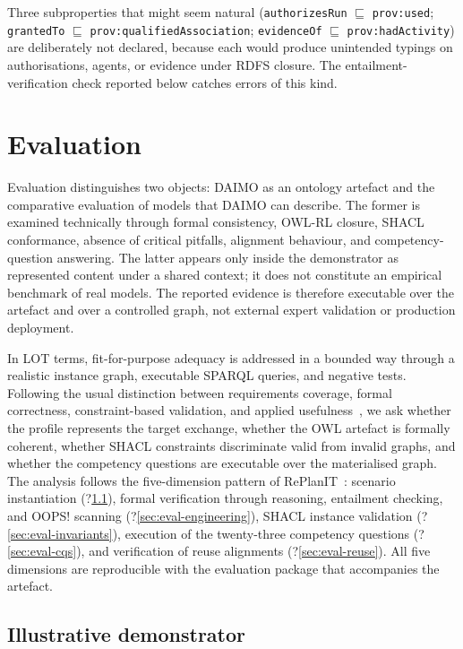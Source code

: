 \documentclass[Afour,sagev,times]{sagej}
\newcommand{\code}[1]{\texttt{#1}}
\begin{document}
Three subproperties that might seem natural (\code{authorizesRun} $\sqsubseteq$ \code{prov:used}; \code{grantedTo} $\sqsubseteq$ \code{prov:qualifiedAssociation}; \code{evidenceOf} $\sqsubseteq$ \code{prov:hadActivity}) are deliberately not declared, because each would produce unintended typings on authorisations, agents, or evidence under RDFS closure. The entailment-verification check reported below catches errors of this kind.

\section{Evaluation}\label{sec:eval}

Evaluation distinguishes two objects: DAIMO as an ontology artefact and the comparative evaluation of models that DAIMO can describe. The former is examined technically through formal consistency, OWL-RL closure, SHACL conformance, absence of critical pitfalls, alignment behaviour, and competency-question answering. The latter appears only inside the demonstrator as represented content under a shared context; it does not constitute an empirical benchmark of real models. The reported evidence is therefore executable over the artefact and over a controlled graph, not external expert validation or production deployment.

In LOT terms, fit-for-purpose adequacy is addressed in a bounded way through a realistic instance graph, executable SPARQL queries, and negative tests. Following the usual distinction between requirements coverage, formal correctness, constraint-based validation, and applied usefulness~\cite{brank05}, we ask whether the profile represents the target exchange, whether the OWL artefact is formally coherent, whether SHACL constraints discriminate valid from invalid graphs, and whether the competency questions are executable over the materialised graph. The analysis follows the five-dimension pattern of RePlanIT~\cite{kurteva}: scenario instantiation (?\ref{sec:eval-usecase}), formal verification through reasoning, entailment checking, and OOPS! scanning (?\ref{sec:eval-engineering}), SHACL instance validation (?\ref{sec:eval-invariants}), execution of the twenty-three competency questions (?\ref{sec:eval-cqs}), and verification of reuse alignments (?\ref{sec:eval-reuse}). All five dimensions are reproducible with the evaluation package that accompanies the artefact.

\subsection{Illustrative demonstrator}\label{sec:eval-usecase}
\end{document}
